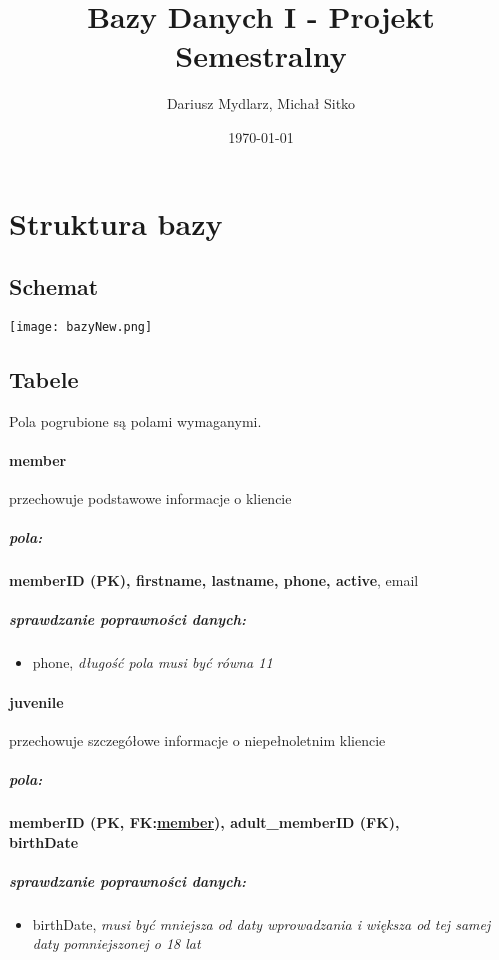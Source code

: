 \documentclass[12pt,a4paper,titlepage]{article}
\title{Bazy Danych I - Projekt Semestralny}
\author{Dariusz Mydlarz, Michał Sitko}
\date{\today}
\begin{document}
\maketitle
\newpage


\section{Struktura bazy}
\subsection{Schemat}
\begin{center}
	\texttt{[image: bazyNew.png]}
	\label{fig:schemat}
\end{center}


\subsection{Tabele}
Pola pogrubione są polami wymaganymi.
\paragraph{member}
przechowuje podstawowe informacje o kliencie
\subparagraph{pola:}
\textbf{memberID (PK), firstname, lastname, phone, active}, email
\subparagraph{sprawdzanie poprawności danych:}
\begin{itemize}
	\item phone, \textit{długość pola musi być równa 11}
\end{itemize}

\newpage

\paragraph{juvenile} przechowuje szczegółowe informacje o niepełnoletnim kliencie
\subparagraph{pola:}
\textbf{memberID (PK, FK:\underline{member}), adult\_memberID (FK),} \\ \textbf{birthDate}
\subparagraph{sprawdzanie poprawności danych:}
\begin{itemize}
	\item birthDate, \textit{musi być mniejsza od daty wprowadzania i większa od tej samej daty pomniejszonej o 18 lat }
\end{itemize}

\end{document}

